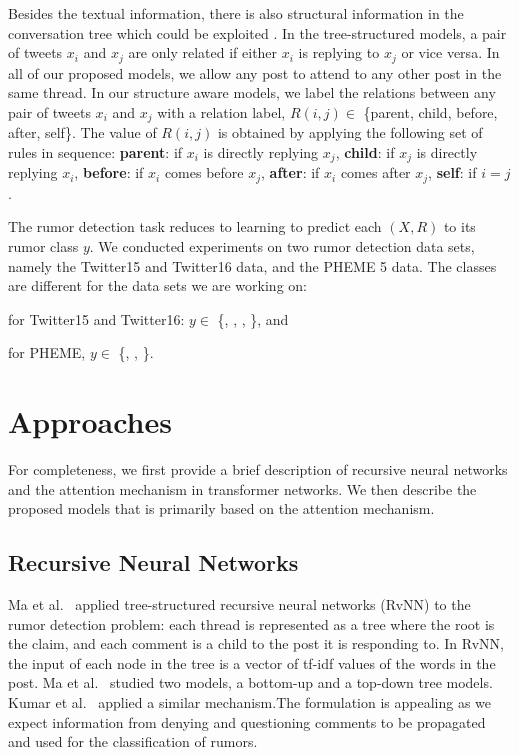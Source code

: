 \documentclass[letterpaper]{article} %
\begin{document}
Besides the textual information, there is also structural information in the conversation tree which could be exploited \cite{ma18,wu15a}. In the tree-structured models, a pair of tweets $x_{i}$ and $x_{j}$ are only related if either $x_{i}$ is replying to $x_{j}$ or vice versa. In all of our proposed models, we allow any post to attend to any other post in the same thread. In our structure aware models, we label the relations between any pair of tweets $x_{i}$ and $x_{j}$ with a relation label, $R(i,j) \in$ \{parent, child, before, after, self\}. The value of $R(i,j)$ is obtained by applying the following set of rules in sequence:
\textbf{parent}: if $x_{i}$ is directly replying $x_{j}$, \textbf{child}: if $x_{j}$ is directly replying $x_{i}$, \textbf{before}: if $x_{i}$ comes before $x_{j}$, \textbf{after}: if $x_{i}$ comes after $x_{j}$, \textbf{self}: if $i=j$.

The rumor detection task reduces to learning to predict each $(X,R)$ to its rumor class $y$. We conducted experiments on two rumor detection data sets, namely the Twitter15 and Twitter16 data, and the PHEME 5 data. The classes are different for the data sets we are working on:
\begin{itemize*}
\item for Twitter15 and Twitter16: $y\in$ \{\nonrumor{}, \falserumor{}, \truerumor{},  \unverified{}\}, and
\item for PHEME, $y \in $ \{\falserumor{}, \truerumor{},  \unverified{}\}.
\end{itemize*}

\section{Approaches} \label{rumor_detection_transformer}

For completeness, we first provide a brief description of recursive neural networks and the attention mechanism in transformer networks. We then describe the proposed models that is primarily based on the attention mechanism.

\subsection{Recursive Neural Networks}
\label{rvnn}

Ma et al.~ applied tree-structured recursive neural networks (RvNN) to the rumor detection problem: each thread is represented as a tree where the root is the claim, and each comment is a child to the post it is responding to.
In RvNN,  the input  of  each  node  in  the  tree is a vector of tf-idf values of the words in the post. Ma et al.~ studied two models, a bottom-up and a top-down tree models. Kumar et al.~ applied a similar mechanism.The formulation is appealing as we expect information from denying and questioning comments to be propagated and used for the classification of rumors.
\end{document}
